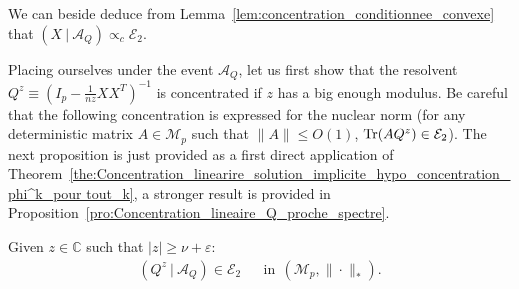\documentclass[a4papaer, titlepage]{book}
\begin{document}
We can beside deduce from Lemma~\ref{lem:concentration_conditionnee_convexe} that $(X \ |\ \mathcal A_Q) \propto_c \mathcal E_2$.

Placing ourselves under the event $\mathcal A_Q$, let us first show that the resolvent $Q^z \equiv (I_p - \frac{1}{nz}XX^T)^{-1}$ is concentrated if $z$ has a big enough modulus. Be careful that the following concentration is expressed for the nuclear norm (for any deterministic matrix $A \in \mathcal{M}_{p}$ such that $\|A\|\leq O(1)$, $\operatorname{Tr}(AQ^z) \in \mathcal E_2$).
The next proposition is just provided as a first direct application of Theorem~\ref{the:Concentration_linearire_solution_implicite_hypo_concentration_phi^k_pour tout_k}, a stronger result is provided in Proposition~\ref{pro:Concentration_lineaire_Q_proche_spectre}.
\begin{proposition}\label{pro:concentration_resolvent_concentration_convexe_z_hors_de_boule}
  Given $z \in \mathbb C$ such that $|z| \geq \nu + \varepsilon$:
  \begin{align*}
    (Q^z \ | \ \mathcal A_Q) \in \mathcal E_2&
    &\text{in} \ \ (\mathcal M_{p}, \| \cdot \|_*).
  \end{align*}
\end{proposition}
\end{document}
